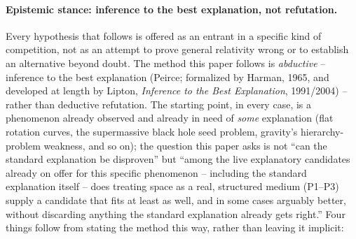 \documentclass[12pt, a4paper]{article}
\begin{document}
\paragraph{Epistemic stance: inference to the best explanation, not
refutation.}
Every hypothesis that follows is offered as an entrant in a specific
kind of competition, not as an attempt to prove general relativity
wrong or to establish an alternative beyond doubt. The method this
paper follows is \emph{abductive} -- inference to the best explanation
(Peirce; formalized by Harman, 1965, and developed at length by
Lipton, \emph{Inference to the Best Explanation}, 1991/2004) -- rather
than deductive refutation. The starting point, in every case, is a
phenomenon already observed and already in need of \emph{some}
explanation (flat rotation curves, the supermassive black hole seed
problem, gravity's hierarchy-problem weakness, and so on); the
question this paper asks is not ``can the standard explanation be
disproven'' but ``among the live explanatory candidates already on
offer for this specific phenomenon -- including the standard
explanation itself -- does treating space as a real, structured
medium (P1--P3) supply a candidate that fits at least as well, and in
some cases arguably better, without discarding anything the standard
explanation already gets right.'' Four things follow from stating the
method this way, rather than leaving it implicit:
\end{document}
